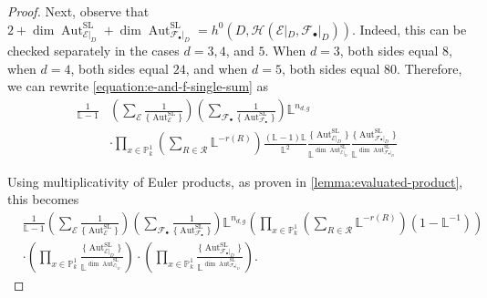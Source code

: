 \documentclass[12 pt]{amsart}
\theoremstyle{plain}
\theoremstyle{definition}
\theoremstyle{remark}
\numberwithin{equation}{section}
\newcommand\bl{\mathbb L}
\newcommand\bp{\mathbb P}
\newcommand\sce{\mathscr E}
\newcommand\scf{\mathscr F}
\newcommand\sch{\mathscr H}
\newcommand\systemdim[2]{n_{#1,#2}} %
\DeclareMathOperator\aut{Aut}
\renewcommand\sl{\mathrm{SL}}
\begin{document}
\begin{proof}
Next, observe that $2 + \dim \aut^{\sl}_{\sce|_D} + \dim \aut^{\sl}_{\scf_\bullet|_D} = h^0(D, \sch(\sce|_D,
\scf_\bullet|_D))$. Indeed, this can be checked separately in the cases $d = 3,
4$, and $5$. When $d = 3$, both sides equal $8$, when $d = 4$, both sides equal
$24$, and when $d = 5$, both sides equal $80$.  Therefore, we can rewrite
\eqref{equation:e-and-f-single-sum} as 
\begin{equation}
	\begin{aligned}
	\label{equation:e-and-f-single-sum-three} \frac{1}{\bl - 1} &\left(
	\sum_{\sce} \frac{1}{\{\aut^{\sl}_{\sce}\}} \right) \left(
	\sum_{\scf_\bullet} \frac{1}{\{\aut^{\sl}_{\scf_\bullet}\}} \right)
	\bl^{\systemdim d g} \\
	& \cdot\prod_{x \in \bp^1_k} \left( \sum_{R \in \mathcal
	R} \bl^{-r(R)} \right) \frac{(\bl -1)\bl}{\bl^2}
	\frac{\{\aut^{\sl}_{\sce|_D}\}}{\bl^{\dim \aut^{\sl}_{\sce|_D}}}
	\frac{\{\aut^{\sl}_{\scf_\bullet|_D}\}}{\bl^{\dim
	\aut^{\sl}_{\scf_\bullet|_D}}} \end{aligned} 
\end{equation}
	
	Using multiplicativity of
	Euler products, as proven in \autoref{lemma:evaluated-product}, this becomes
	\begin{equation} 		\begin{aligned} 
			\label{equation:e-and-f-sums-and-products}
&\frac{1}{\bl - 1} \left( \sum_{\sce}
			\frac{1}{\{\aut^{\sl}_{\sce}\}} \right) \left(
			\sum_{\scf_\bullet}
		\frac{1}{\{\aut^{\sl}_{\scf_\bullet}\}} \right) \bl^{\systemdim d
		g} \left( \prod_{x \in \bp^1_k} \left( \sum_{R \in \mathcal R}
		\bl^{-r(R)} \right) \left( 1-\bl^{-1} \right) \right)\\ &\cdot
		\left( \prod_{x \in
		\bp^1_k}\frac{\{\aut^{\sl}_{\sce|_D}\}}{\bl^{\dim
	\aut^{\sl}_{\sce|_D}}} \right) \cdot \left( \prod_{x \in
	\bp^1_k}\frac{\{\aut^{\sl}_{\scf_\bullet|_D}\}}{\bl^{\dim
\aut^{\sl}_{\scf_\bullet|_D}}} \right). \end{aligned} \end{equation} 


\end{proof}
\end{document}
